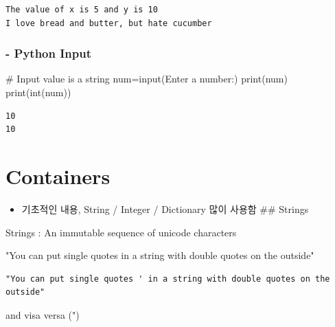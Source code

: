 \documentclass[
  letterpaper,
  DIV=11,
  numbers=noendperiod]{scrreprt}
\newenvironment{Shaded}{\begin{snugshade}}{\end{snugshade}}
\newcommand{\BuiltInTok}[1]{\textcolor[rgb]{0.00,0.23,0.31}{#1}}
\newcommand{\CommentTok}[1]{\textcolor[rgb]{0.37,0.37,0.37}{#1}}
\newcommand{\NormalTok}[1]{\textcolor[rgb]{0.00,0.23,0.31}{#1}}
\newcommand{\OperatorTok}[1]{\textcolor[rgb]{0.37,0.37,0.37}{#1}}
\newcommand{\StringTok}[1]{\textcolor[rgb]{0.13,0.47,0.30}{#1}}
\providecommand{\tightlist}{%
  \setlength{\itemsep}{0pt}\setlength{\parskip}{0pt}}\usepackage{longtable,booktabs,array}
\begin{document}
\begin{verbatim}
The value of x is 5 and y is 10
I love bread and butter, but hate cucumber
\end{verbatim}

\subsection{- Python Input}\label{python-input}

\begin{Shaded}
\begin{Highlighting}[]
\CommentTok{\# Input value is a string}
\NormalTok{num}\OperatorTok{=}\BuiltInTok{input}\NormalTok{(}\StringTok{\textquotesingle{}Enter a number:\textquotesingle{}}\NormalTok{)}
\BuiltInTok{print}\NormalTok{(num)}
\BuiltInTok{print}\NormalTok{(}\BuiltInTok{int}\NormalTok{(num))}
\end{Highlighting}
\end{Shaded}

\begin{verbatim}
10
10
\end{verbatim}

\chapter{Containers}\label{containers}

\begin{itemize}
\tightlist
\item
  기초적인 내용, String / Integer / Dictionary 많이 사용함 \#\# Strings
\end{itemize}

Strings : An immutable sequence of unicode characters

\begin{Shaded}
\begin{Highlighting}[]
\CommentTok{"You can put single quotes \textquotesingle{} in a string with double quotes on the outside"}
\end{Highlighting}
\end{Shaded}

\begin{verbatim}
"You can put single quotes ' in a string with double quotes on the outside"
\end{verbatim}

\begin{Shaded}
\begin{Highlighting}[]
\CommentTok{\textquotesingle{}and visa versa (")\textquotesingle{}}
\end{Highlighting}
\end{Shaded}
\end{document}
